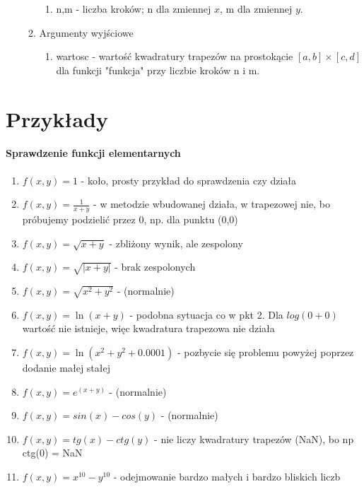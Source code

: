 \documentclass{article}
\begin{document}
\begin{enumerate}
\begin{enumerate}
\begin{enumerate}
                \item n,m - liczba kroków; n dla zmiennej $x$, m dla zmiennej $y$.
            \end{enumerate}
            \item Argumenty wyjściowe
            \begin{enumerate}
                  \item wartosc - wartość kwadratury trapezów na prostokącie $[a,b]\times[c,d]$ dla funkcji "funkcja" przy liczbie kroków n i m.
            \end{enumerate}
        \end{enumerate}
\end{enumerate}

\section{Przykłady}
\paragraph{Sprawdzenie funkcji elementarnych}
\begin{enumerate}
    \item $f(x,y) = 1$ - koło, prosty przykład do sprawdzenia czy działa
    \item $f(x,y) = \frac{1}{x+y}$ - w metodzie wbudowanej działa, w trapezowej nie, bo próbujemy podzielić przez 0, np. dla punktu (0,0)
    \item $f(x,y) = \sqrt{x+y}$ - zbliżony wynik, ale zespolony 
    \item $f(x,y) = \sqrt{|x+y|}$ - brak zespolonych
    \item $f(x,y) = \sqrt{x^2+y^2}$ - (normalnie)
    \item $f(x,y) = \ln(x+y)$ - podobna sytuacja co w pkt 2. Dla $log(0+0)$ wartość nie istnieje, więc kwadratura trapezowa nie działa
    \item $f(x,y) = \ln(x^2+y^2 + 0.0001)$ - pozbycie się problemu powyżej poprzez dodanie małej stałej
    \item $f(x,y) = e^{(x+y)}$ - (normalnie)
    \item $f(x,y) = sin(x)-cos(y)$ - (normalnie)
    \item $f(x,y) = tg(x)-ctg(y)$ - nie liczy kwadratury trapezów (NaN), bo np ctg(0) = NaN
    \item $f(x,y) = x^{10}-y^{10}$ - odejmowanie bardzo małych i bardzo bliskich liczb 
\end{enumerate}
\end{document}
